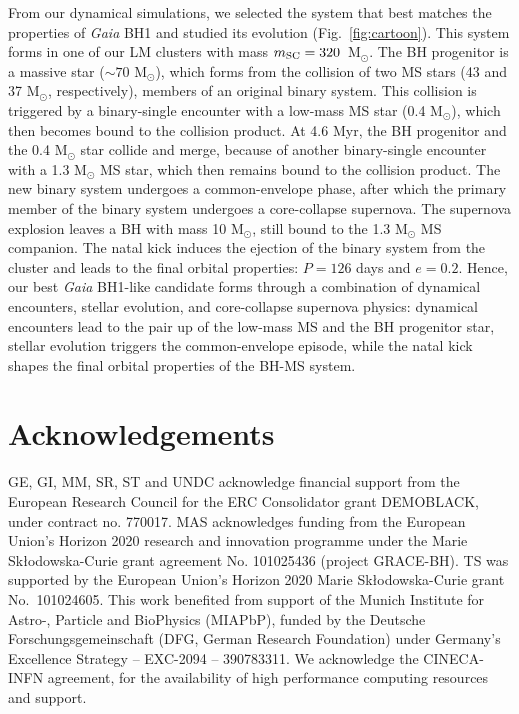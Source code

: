 \documentclass[fleqn,usenatbib]{mnras}
\newcommand{\Ms}{M$_\odot$}
\newcommand{\bh}{\textit{Gaia} BH1}
\begin{document}
From our dynamical simulations, we selected the system that best matches the properties of \bh{} and studied its evolution (Fig.~\ref{fig:cartoon}). This system forms in one of our LM clusters with mass $m_{\rm SC}=320$~M$_\odot$. 
The BH progenitor is a massive star ($\sim 70$ \Ms), which forms from the collision of two  
MS stars (43 and 37 M$_\odot$, respectively), members of an original binary system. This collision is triggered by a binary-single encounter with a low-mass MS star (0.4 M$_\odot$), which then becomes bound to the collision product. At 4.6 Myr, the BH progenitor and the 0.4 M$_\odot$ star collide and merge, because of another binary-single encounter with a 1.3 M$_\odot$ MS star, which then remains bound to the collision product. The new binary system undergoes a common-envelope phase, after which the primary member of the binary system undergoes a core-collapse supernova. The supernova explosion leaves a BH with mass 10 M$_\odot$, still bound to the 1.3 M$_\odot$ MS companion. The natal kick 
induces the ejection of the binary system from the cluster and leads to the final orbital properties: $P=126$ days and $e=0.2$. 
Hence, our best \bh{}-like candidate forms through a combination of dynamical encounters, 
stellar evolution, and core-collapse supernova physics: dynamical encounters lead to the pair up of the low-mass MS and the BH progenitor star, stellar evolution triggers the common-envelope episode, while the natal kick shapes the final orbital properties of the BH-MS system.









\section*{Acknowledgements} 
GE, GI, MM, SR, ST and UNDC acknowledge financial support from the European Research Council for the ERC Consolidator grant DEMOBLACK, under contract no. 770017.
MAS acknowledges funding from the European Union’s Horizon 2020 research and innovation programme under the Marie Skłodowska-Curie grant agreement No. 101025436 (project GRACE-BH). TS was supported by the European Union's Horizon 2020 Marie Skłodowska-Curie grant No.\ 101024605.
This work benefited from support of %
the Munich Institute for Astro-, Particle and BioPhysics 
(MIAPbP), funded by the Deutsche Forschungsgemeinschaft (DFG, German Research Foundation) 
under Germany's Excellence Strategy – EXC-2094 – 390783311. 
We acknowledge the CINECA-INFN agreement, for the availability of high performance computing resources and support.
\end{document}
